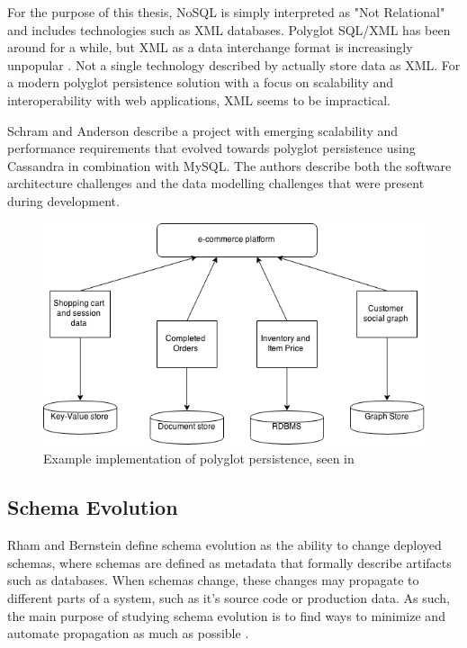 For the purpose of this thesis, NoSQL is simply interpreted as "Not Relational" and includes technologies such as XML databases. Polyglot SQL/XML has been around for a while, but XML as a data interchange format is increasingly unpopular \cite{JSONData}. Not a single technology described by \cite{Catell} actually store data as XML. For a modern polyglot persistence solution with a focus on scalability and interoperability with web applications, XML seems to be impractical. 

Schram and Anderson \cite{MySQLToNoSQL} describe a project with emerging scalability and performance requirements that evolved towards polyglot persistence using Cassandra in combination with MySQL. The authors describe both the software architecture challenges and the data modelling challenges that were present during development.

\begin{figure}[h!]
\centering
\includegraphics[scale=0.5]{figure/Polyglot.png}
\caption{Example implementation of polyglot persistence, seen in \cite{NoSQLDistilled}}
\label{fig:polyglot}
\end{figure}


\subsection{Schema Evolution}
Rham and Bernstein \cite{SchemaEvolutionBib} define schema evolution as the ability to change deployed schemas, where schemas are defined as metadata that formally describe artifacts such as databases. When schemas change, these changes may propagate to different parts of a system, such as it's source code or production data. As such, the main purpose of studying schema evolution is to find ways to minimize and automate propagation as much as possible \cite{SchemaEvolutionBib}.

